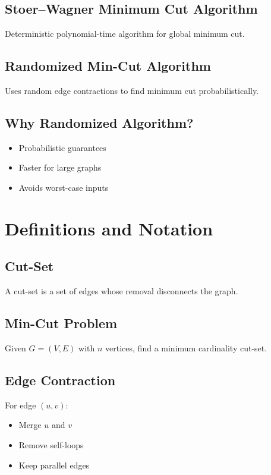 \documentclass[12pt]{article}
\begin{document}
\subsection{Stoer--Wagner Minimum Cut Algorithm}
Deterministic polynomial-time algorithm for global minimum cut.

\subsection{Randomized Min-Cut Algorithm}
Uses random edge contractions to find minimum cut probabilistically.

\subsection{Why Randomized Algorithm?}
\begin{itemize}
    \item Probabilistic guarantees
    \item Faster for large graphs
    \item Avoids worst-case inputs
\end{itemize}

\section{Definitions and Notation}

\subsection{Cut-Set}
A cut-set is a set of edges whose removal disconnects the graph.

\subsection{Min-Cut Problem}
Given $G=(V,E)$ with $n$ vertices, find a minimum cardinality cut-set.

\subsection{Edge Contraction}
For edge $(u,v)$:
\begin{itemize}
    \item Merge $u$ and $v$
    \item Remove self-loops
    \item Keep parallel edges
\end{itemize}
\end{document}
